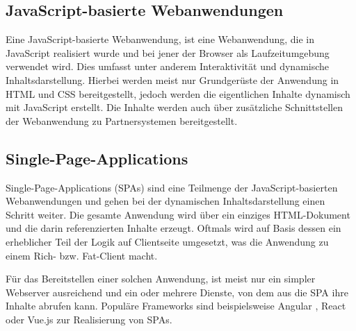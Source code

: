 


\subsection{JavaScript-basierte Webanwendungen}

Eine JavaScript-basierte Webanwendung, ist eine Webanwendung, die in JavaScript realisiert wurde und bei jener der Browser als Laufzeitumgebung verwendet wird. Dies umfasst unter anderem Interaktivität und dynamische Inhaltsdarstellung. Hierbei werden meist nur Grundgerüste der Anwendung in HTML und CSS bereitgestellt, jedoch werden die eigentlichen Inhalte dynamisch mit JavaScript erstellt. Die Inhalte werden auch über zusätzliche Schnittstellen der Webanwendung zu Partnersystemen bereitgestellt.

\subsection{Single-Page-Applications}
\label{subsec:singe-page-applications}

Single-Page-Applications (SPAs) sind eine Teilmenge der JavaScript-basierten Webanwendungen und gehen bei der dynamischen Inhaltsdarstellung einen Schritt weiter. Die gesamte Anwendung wird über ein einziges HTML-Dokument und die darin referenzierten Inhalte erzeugt. Oftmals wird auf Basis dessen ein erheblicher Teil der Logik auf Clientseite umgesetzt, was die Anwendung zu einem Rich- bzw. Fat-Client macht.

Für das Bereitstellen einer solchen Anwendung, ist meist nur ein simpler Webserver ausreichend und ein oder mehrere Dienste, von dem aus die SPA ihre Inhalte abrufen kann. Populäre Frameworks sind beispielsweise Angular \cite{AngularHomepage}, React \cite{ReactHomepage} oder Vue.js \cite{VueJSHomepage} zur Realisierung von SPAs.

